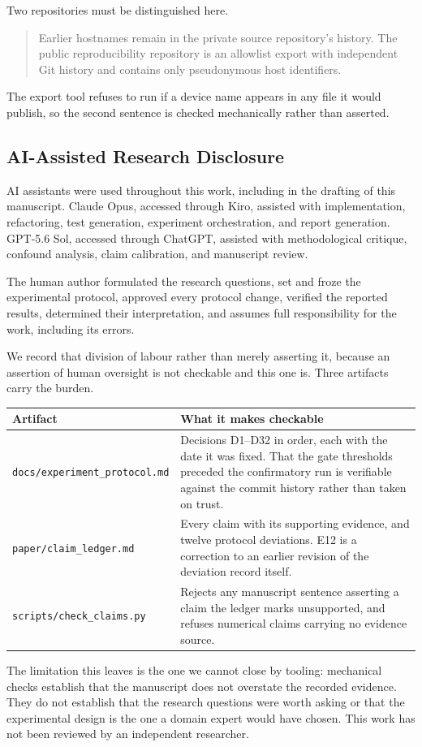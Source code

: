 Two repositories must be distinguished here.

\begin{quote}
Earlier hostnames remain in the private source repository's history. The public
reproducibility repository is an allowlist export with independent Git history and
contains only pseudonymous host identifiers.
\end{quote}

The export tool refuses to run if a device name appears in any file it would publish, so
the second sentence is checked mechanically rather than asserted.

\subsection*{AI-Assisted Research Disclosure}

AI assistants were used throughout this work, including in the drafting of this
manuscript. Claude Opus, accessed through Kiro, assisted with implementation,
refactoring, test generation, experiment orchestration, and report generation.
GPT-5.6 Sol, accessed through ChatGPT, assisted with methodological critique,
confound analysis, claim calibration, and manuscript review.

The human author formulated the research questions, set and froze the experimental
protocol, approved every protocol change, verified the reported results, determined
their interpretation, and assumes full responsibility for the work, including its
errors.

We record that division of labour rather than merely asserting it, because an assertion
of human oversight is not checkable and this one is. Three artifacts carry the burden.

\begin{center}
\begin{tabularx}{\textwidth}{lX}
\toprule
Artifact & What it makes checkable \\
\midrule
\texttt{docs/experiment\_protocol.md}
  & Decisions D1--D32 in order, each with the date it was fixed. That the gate
    thresholds preceded the confirmatory run is verifiable against the commit history
    rather than taken on trust. \\
\addlinespace
\texttt{paper/claim\_ledger.md}
  & Every claim with its supporting evidence, and twelve protocol deviations. E12 is a
    correction to an earlier revision of the deviation record itself. \\
\addlinespace
\texttt{scripts/check\_claims.py}
  & Rejects any manuscript sentence asserting a claim the ledger marks unsupported, and
    refuses numerical claims carrying no evidence source. \\
\bottomrule
\end{tabularx}
\end{center}

The limitation this leaves is the one we cannot close by tooling: mechanical checks
establish that the manuscript does not overstate the recorded evidence. They do not
establish that the research questions were worth asking or that the experimental design
is the one a domain expert would have chosen. This work has not been reviewed by an
independent researcher.
